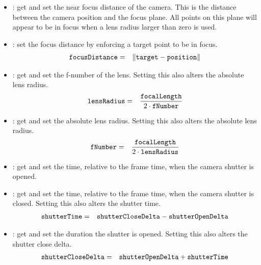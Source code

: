 \begin{itemize}
	\item {}:
 	  get and set the near focus distance of the camera.  This is the distance between the camera position and the focus plane.  All points on this plane will appear to be in focus when a lens radius larger than zero is used.

	\item {}:
 	  set the focus distance by enforcing a target point to be in focus.
	  \begin{eqnarray}
	  	\kw{focusDistance} &=& \left\|\kw{target} - \kw{position}\right\|
	  \end{eqnarray}

 	\item {}:
 	  get and set the f-number of the lens.  Setting this also alters the absolute lens radius.
	  \begin{eqnarray}
	  	\kw{lensRadius} &=& \frac{\kw{focalLength}}{2 \cdot \kw{fNumber}}
	  \end{eqnarray}

 	\item {}:
 	  get and set the absolute lens radius.  Setting this also alters the absolute lens radius.
	  \begin{eqnarray}
	  	\kw{fNumber} &=& \frac{\kw{focalLength}}{2 \cdot \kw{lensRadius}}
	  \end{eqnarray}

 	\item {}:
 	  get and set the time, relative to the frame time, when the camera shutter is opened.

 	\item {}:
 	  get and set the time, relative to the frame time, when the camera shutter is closed.  Setting this also alters the shutter time.
	  \begin{eqnarray}
	  	\kw{shutterTime} &=& \kw{shutterCloseDelta} - \kw{shutterOpenDelta}
	  \end{eqnarray}

 	\item {}:
 	  get and set the duration the shutter is opened.  Setting this also alters the shutter close delta.
	  \begin{eqnarray}
	  	\kw{shutterCloseDelta} &=& \kw{shutterOpenDelta} + \kw{shutterTime}
	  \end{eqnarray}



\end{itemize}
